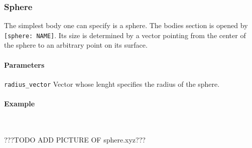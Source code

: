 \subsubsection{Sphere}
The simplest body one can specify is a sphere. The bodies section is opened by \lstinline{[sphere: NAME]}. Its size is determined by a  vector pointing from the center of the sphere to an arbitrary point on its surface.

\paragraph{Parameters}
\begin{description}
 \item{\lstinline{radius_vector}} Vector whose lenght specifies the radius of the sphere.
\end{description}

\paragraph{Example}\ 


???TODO ADD PICTURE OF sphere.xyz???